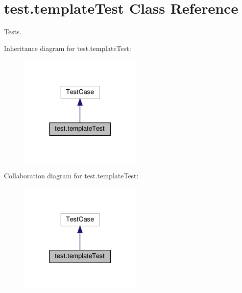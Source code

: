 \hypertarget{classtest_1_1templateTest}{}\section{test.\+template\+Test Class Reference}
\label{classtest_1_1templateTest}


Tests.  




Inheritance diagram for test.\+template\+Test\+:\nopagebreak
\begin{figure}[H]
\begin{center}
\leavevmode
\includegraphics[width=173pt]{classtest_1_1templateTest__inherit__graph}
\end{center}
\end{figure}


Collaboration diagram for test.\+template\+Test\+:\nopagebreak
\begin{figure}[H]
\begin{center}
\leavevmode
\includegraphics[width=173pt]{classtest_1_1templateTest__coll__graph}
\end{center}
\end{figure}
